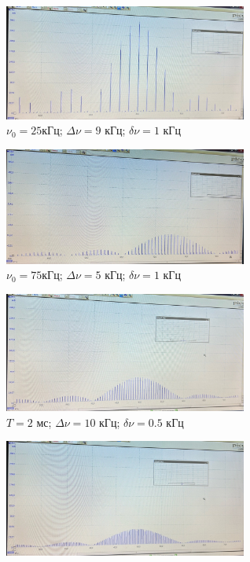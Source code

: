\begin{figure}[h!]
    \centering
    \begin{subfigure}[b]{0.48\linewidth}
        \centering
        \includegraphics[width=8cm]{./images/tusgi/1_25_4_1.jpg}
        \caption{$\nu_0 = 25$кГц; $\Delta\nu = 9$ кГц; $\delta\nu = 1$ кГц}
    \end{subfigure}
    \hfill
    \begin{subfigure}[b]{0.48\linewidth}
        \centering
        \includegraphics[width=8cm]{./images/tusgi/1_75_14_1.jpg}
        \caption{$\nu_0 = 75$кГц; $\Delta\nu = 5$ кГц; $\delta\nu = 1$ кГц}
    \end{subfigure}
    \vfill
    \begin{subfigure}{0.48\linewidth}
        \centering
        \includegraphics[width=8cm]{./images/tusgi/2_2_10_0-5.jpg}
        \caption{$T = 2$ мс; $\Delta\nu = 10$ кГц; $\delta\nu = 0.5$ кГц}
    \end{subfigure}
    \hfill
    \begin{subfigure}{0.48\linewidth}
        \centering
        \includegraphics[width=8cm]{./images/tusgi/2_3_10_0-33.jpg}

\end{subfigure}
\end{figure}

